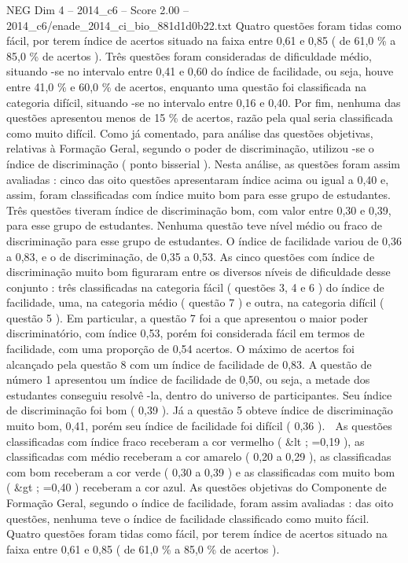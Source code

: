\begin{textsample}{NEG Dim 4 – 2014\_c6 – Score 2.00 – 2014\_c6/enade\_2014\_ci\_bio\_881d1d0b22.txt}
Quatro questões foram tidas como fácil, por terem índice de acertos situado na faixa entre 0,61 e 0,85 ( de 61,0 \% a 85,0 \% de acertos ).
Três questões foram consideradas de dificuldade médio, situando -se no intervalo entre 0,41 e 0,60 do índice de facilidade, ou seja, houve entre 41,0 \% e 60,0 \% de acertos, enquanto uma questão foi classificada na categoria difícil, situando -se no intervalo entre 0,16 e 0,40.
Por fim, nenhuma das questões apresentou menos de 15 \% de acertos, razão pela qual seria classificada como muito difícil.
Como já comentado, para análise das questões objetivas, relativas à Formação Geral, segundo o poder de discriminação, utilizou -se o índice de discriminação ( ponto bisserial ).
Nesta análise, as questões foram assim avaliadas : cinco das oito questões apresentaram índice acima ou igual a 0,40 e, assim, foram classificadas com índice muito bom para esse grupo de estudantes.
Três questões tiveram índice de discriminação bom, com valor entre 0,30 e 0,39, para esse grupo de estudantes.
Nenhuma questão teve nível médio ou fraco de discriminação para esse grupo de estudantes.
O índice de facilidade variou de 0,36 a 0,83, e o de discriminação, de 0,35 a 0,53.
As cinco questões com índice de discriminação muito bom figuraram entre os diversos níveis de dificuldade desse conjunto : três classificadas na categoria fácil ( questões 3, 4 e 6 ) do índice de facilidade, uma, na categoria médio ( questão 7 ) e outra, na categoria difícil ( questão 5 ).
Em particular, a questão 7 foi a que apresentou o maior poder discriminatório, com índice 0,53, porém foi considerada fácil em termos de facilidade, com uma proporção de 0,54 acertos.
O máximo de acertos foi alcançado pela questão 8 com um índice de facilidade de 0,83.
A questão de número 1 apresentou um índice de facilidade de 0,50, ou seja, a metade dos estudantes conseguiu resolvê -la, dentro do universo de participantes.
Seu índice de discriminação foi bom ( 0,39 ).
Já a questão 5 obteve índice de discriminação muito bom, 0,41, porém seu índice de facilidade foi difícil ( 0,36 ).  As questões classificadas com índice fraco receberam a cor vermelho ( \&lt ; =0,19 ), as classificadas com médio receberam a cor amarelo ( 0,20 a 0,29 ), as classificadas com bom receberam a cor verde ( 0,30 a 0,39 ) e as classificadas com muito bom ( \&gt ; =0,40 ) receberam a cor azul.
As questões objetivas do Componente de Formação Geral, segundo o índice de facilidade, foram assim avaliadas : das oito questões, nenhuma teve o índice de facilidade classificado como muito fácil.
Quatro questões foram tidas como fácil, por terem índice de acertos situado na faixa entre 0,61 e 0,85 ( de 61,0 \% a 85,0 \% de acertos ).

\end{textsample}
